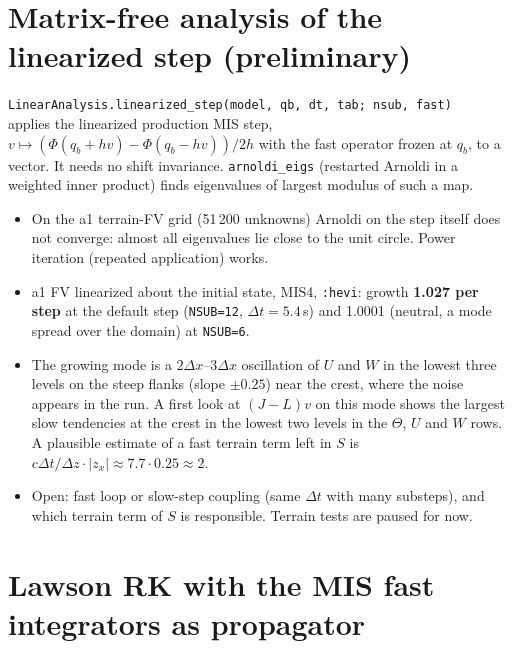 \documentclass[11pt,a4paper]{article}
\newcommand{\code}[1]{\texttt{#1}}
\newcommand{\dt}{\Delta t}
\begin{document}
\section{Matrix-free analysis of the linearized step (preliminary)}\label{sec:matfree}

\code{LinearAnalysis.linearized\_step(model, qb, dt, tab; nsub, fast)}\\ applies the linearized
production MIS step, $v\mapsto(\Phi(q_b+hv)-\Phi(q_b-hv))/2h$ with the fast operator frozen at $q_b$,
to a vector. It needs no shift invariance. \code{arnoldi\_eigs} (restarted Arnoldi in a weighted inner
product) finds eigenvalues of largest modulus of such a map.

\begin{itemize}
\item On the a1 terrain-FV grid (51\,200 unknowns) Arnoldi on the step itself does not converge:
  almost all eigenvalues lie close to the unit circle. Power iteration (repeated application) works.
\item a1 FV linearized about the initial state, MIS4, \code{:hevi}:
  growth \textbf{1.027 per step} at the default step (\code{NSUB=12}, $\dt = 5.4$\,s) and 1.0001
  (neutral, a mode spread over the domain) at \code{NSUB=6}.
\item The growing mode is a $2\Delta x$--$3\Delta x$ oscillation of $U$ and $W$ in the lowest three
  levels on the steep flanks (slope $\pm0.25$) near the crest, where the noise appears in the run.
  A first look at $(J-L)v$ on this mode shows the largest slow tendencies at the crest in the lowest
  two levels in the $\Theta$, $U$ and $W$ rows. A plausible estimate of a fast terrain term left in
  $S$ is $c\dt/\Delta z\cdot|z_x|\approx7.7\cdot0.25\approx2$.
\item Open: fast loop or slow-step coupling (same $\dt$ with many substeps), and which terrain term
  of $S$ is responsible. Terrain tests are paused for now.
\end{itemize}

\section{Lawson RK with the MIS fast integrators as propagator}\label{sec:lawson}
\end{document}
